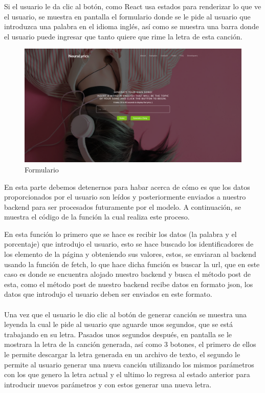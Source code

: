 \documentclass[12pt, a4paper, titlepage]{article}
\begin{document}
	Si el usuario le da clic al botón, como React usa estados para renderizar lo que ve el usuario, se muestra en pantalla el formulario donde se le pide al usuario que introduzca una palabra en el idioma inglés, así como se muestra una barra donde el usuario puede ingresar que tanto quiere que rime la letra de esta canción.
	\begin{figure}[H]
		\includegraphics[width=13.5cm]{./Imagenes/AplicacionWeb/pform.png}
		\centering 
		\caption{Formulario}
	\end{figure}
	En esta parte debemos detenernos para habar acerca de cómo es que los datos proporcionados por el usuario son leídos y posteriormente enviados a nuestro backend para ser procesados futuramente por el modelo. A continuación, se muestra el código de la función la cual realiza este proceso.
	\begin{center}
		
	\end{center}
	En esta función lo primero que se hace es recibir los datos (la palabra y el porcentaje) que introdujo el usuario, esto se hace buscado los identificadores de los elemento de la página y obteniendo sus valores, estos, se enviaran al backend usando la función de fetch, lo que hace dicha función es buscar la url, que en este caso es donde se encuentra alojado nuestro backend y busca el método post de esta, como el método post de nuestro backend recibe datos en formato json, los datos que introdujo el usuario deben ser enviados en este formato.\\\\
	Una vez que el usuario le dio clic al botón de generar canción se muestra una leyenda la cual le pide al usuario que aguarde unos segundos, que se está trabajando en su letra. Pasados unos segundos después, en pantalla se le mostrara la letra de la canción generada, así como 3 botones, el primero de ellos le permite descargar la letra generada en un archivo de texto, el segundo le permite al usuario generar una nueva canción utilizando los mismos parámetros con los que genero la letra actual y el ultimo lo regresa al estado anterior para introducir nuevos parámetros y con estos generar una nueva letra.
\end{document}
